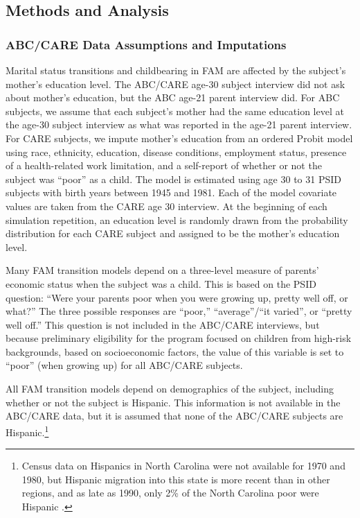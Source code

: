 \subsection{Methods and Analysis}

\subsubsection{ABC/CARE Data Assumptions and Imputations}
\label{section:FAM_ABC_impute}


\noindent Marital status transitions and childbearing in FAM are affected by the subject's mother's education level. The ABC/CARE age-30 subject interview did not ask about mother's education, but the ABC age-21 parent interview did.
For ABC subjects, we assume that each subject's mother had the same education level at the age-30 subject interview as what was reported in the age-21 parent interview. For CARE subjects, we impute mother's education from an ordered Probit model using race, ethnicity, education, disease conditions, employment status, presence of a health-related work limitation, and a self-report of whether or not the subject was ``poor'' as a child.  The model is estimated using age 30 to 31 PSID subjects with birth years between 1945 and 1981. Each of the model covariate values are taken from the CARE age 30 interview. At the beginning of each simulation repetition, an education level is randomly drawn from the probability distribution for each CARE subject and assigned to be the mother's education level.

\noindent Many FAM transition models depend on a three-level measure of parents' economic status when the subject was a child.
This is based on the PSID question: ``Were your parents poor when you were growing up, pretty well off, or what?''
The three possible responses are ``poor,'' ``average''/``it varied'', or ``pretty well off.''
This question is not included in the ABC/CARE interviews, but because preliminary eligibility for the program focused on children from high-risk backgrounds, based on socioeconomic factors, the value of this variable is set to ``poor'' (when growing up) for all ABC/CARE subjects.

\noindent All FAM transition models depend on demographics of the subject, including whether or not the subject is Hispanic.
This information is not available in the ABC/CARE data, but it is assumed that none of the ABC/CARE subjects are Hispanic.\footnote{Census data on Hispanics in North Carolina were not available for 1970 and 1980, but Hispanic migration into this state is more recent than in other regions, and as late as 1990, only 2\% of the North Carolina poor were Hispanic \citep{Johnson_2003_Changing-Poverty}.}

